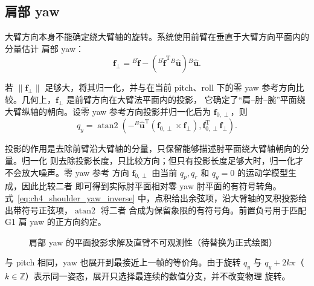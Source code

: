 \subsection{肩部 yaw}
\label{subsec:ch4_shoulder_yaw}

大臂方向本身不能确定绕大臂轴的旋转。系统使用前臂在垂直于大臂方向平面内的分量估计
肩部 yaw：
\begin{equation}
  \boldsymbol f_{\perp}=
  {}^{B}\hat{\boldsymbol f}-
  \left({}^{B}\hat{\boldsymbol f}^{\mathrm T}
  {}^{B}\hat{\boldsymbol u}\right)
  {}^{B}\hat{\boldsymbol u}.
  \label{eq:ch4_forearm_perpendicular_component}
\end{equation}

若 $\lVert\boldsymbol f_{\perp}\rVert$ 足够大，将其归一化，并与在当前 pitch、roll 下的零
yaw 参考方向比较。几何上，$\boldsymbol f_{\perp}$ 是前臂方向在大臂法平面内的投影，
它确定了“肩--肘--腕”平面绕大臂纵轴的朝向。设零 yaw 参考方向投影并归一化后为
$\boldsymbol f_{0,\perp}$，则
\begin{equation}
  q_y=\operatorname{atan2}
  \left(
  -{}^{B}\hat{\boldsymbol u}^{\mathrm T}
  (\boldsymbol f_{0,\perp}\times\boldsymbol f_{\perp}),
  \boldsymbol f_{0,\perp}^{\mathrm T}\boldsymbol f_{\perp}
  \right).
  \label{eq:ch4_shoulder_yaw_inverse}
\end{equation}

投影的作用是去除前臂沿大臂轴的分量，只保留能够描述肘平面绕大臂轴朝向的分量。归一化
则去除投影长度，只比较方向；但只有投影长度足够大时，归一化才不会放大噪声。零 yaw 参考
方向 $\boldsymbol f_{0,\perp}$ 由当前 $q_p,q_r$ 和 $q_y=0$ 的运动学模型生成，因此比较二者
即可得到实际肘平面相对零 yaw 肘平面的有符号转角。式~\eqref{eq:ch4_shoulder_yaw_inverse}
中，点积给出余弦项，沿大臂轴的叉积投影给出带符号正弦项，$\operatorname{atan2}$ 将二者
合成为保留象限的有符号角。前置负号用于匹配 G1 肩 yaw 的正方向约定。

\begin{figure}[htbp]
  \centering
  \caption{肩部 yaw 的平面投影求解及直臂不可观测性（待替换为正式绘图）}
  \label{fig:ch4_yaw_projection_observability}
\end{figure}

与 pitch 相同，yaw 也展开到最接近上一帧的等价角。由于旋转 $q_y$ 与
$q_y+2k\pi$（$k\in\mathbb Z$）表示同一姿态，展开只选择最连续的数值分支，并不改变物理
旋转。

